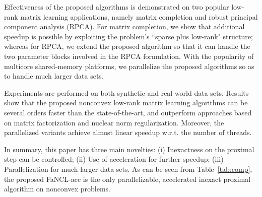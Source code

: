 \documentclass[10pt,journal,compsoc]{IEEEtran}
\begin{document}
Effectiveness of the proposed
algorithms is demonstrated on two popular low-rank matrix learning applications,
namely matrix completion and robust principal component analysis (RPCA).  For matrix
completion, we show that additional speedup is possible by exploiting the problem's ``sparse
plus low-rank" structure; whereas for RPCA, we extend the proposed algorithm so that it can
handle the two parameter blocks involved in the RPCA formulation.
With the popularity of  multicore shared-memory platforms, we parallelize
the proposed algorithms so as to handle much larger data sets.

Experiments are performed on both synthetic and real-world data sets.
Results show that the proposed nonconvex low-rank matrix learning algorithms can be several orders faster than the state-of-the-art,
and outperform approaches based on matrix factorization and nuclear norm regularization.
Moreover, the parallelized variants achieve almost linear speedup w.r.t. the number of threads.



In summary,
this paper has three main novelties:
(i) 
Inexactness on the proximal step can be controlled;
(ii) 
Use of acceleration for further speedup; (iii) Parallelization for much larger data sets. 
As can be seen
from Table~\ref{tab:comp}, 
the proposed \textsf{FaNCL-acc} 
is the only  parallelizable,
accelerated inexact
proximal 
algorithm 
on nonconvex problems.
\end{document}
